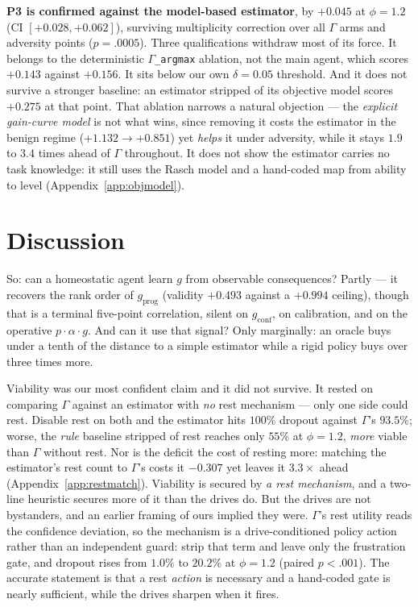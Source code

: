\documentclass{article}
\begin{document}
\textbf{P3 is confirmed against the model-based estimator}, by $+0.045$ at $\phi{=}1.2$ (CI $[+0.028,+0.062]$), surviving multiplicity correction over all $\Gamma$ arms and adversity points ($p{=}.0005$). Three qualifications withdraw most of its force. It belongs to the deterministic \texttt{$\Gamma$\_argmax} ablation, not the main agent, which scores $+0.143$ against $+0.156$. It sits below our own $\delta{=}0.05$ threshold. And it does not survive a stronger baseline: an estimator stripped of its objective model scores $+0.275$ at that point. That ablation narrows a natural objection --- the \emph{explicit gain-curve model} is not what wins, since removing it costs the estimator in the benign regime ($+1.132\to+0.851$) yet \emph{helps} it under adversity, while it stays $1.9$ to $3.4$ times ahead of $\Gamma$ throughout. It does not show the estimator carries no task knowledge: it still uses the Rasch model and a hand-coded map from ability to level (Appendix~\ref{app:objmodel}).

\section{Discussion}
\label{sec:discussion}

So: can a homeostatic agent learn $g$ from observable consequences? Partly --- it recovers the rank order of $g_{\text{prog}}$ (validity $+0.493$ against a $+0.994$ ceiling), though that is a terminal five-point correlation, silent on $g_{\text{conf}}$, on calibration, and on the operative $p\cdot\alpha\cdot g$. And can it use that signal? Only marginally: an oracle buys under a tenth of the distance to a simple estimator while a rigid policy buys over three times more.

Viability was our most confident claim and it did not survive. It rested on comparing $\Gamma$ against an estimator with \emph{no} rest mechanism --- only one side could rest. Disable rest on both and the estimator hits $100\%$ dropout against $\Gamma$'s $93.5\%$; worse, the \emph{rule} baseline stripped of rest reaches only $55\%$ at $\phi{=}1.2$, \emph{more} viable than $\Gamma$ without rest. Nor is the deficit the cost of resting more: matching the estimator's rest count to $\Gamma$'s costs it $-0.307$ yet leaves it $3.3\times$ ahead (Appendix~\ref{app:restmatch}). Viability is secured by \emph{a rest mechanism}, and a two-line heuristic secures more of it than the drives do. But the drives are not bystanders, and an earlier framing of ours implied they were. $\Gamma$'s rest utility reads the confidence deviation, so the mechanism is a drive-conditioned policy action rather than an independent guard: strip that term and leave only the frustration gate, and dropout rises from $1.0\%$ to $20.2\%$ at $\phi{=}1.2$ (paired $p<.001$). The accurate statement is that a rest \emph{action} is necessary and a hand-coded gate is nearly sufficient, while the drives sharpen when it fires.
\end{document}
